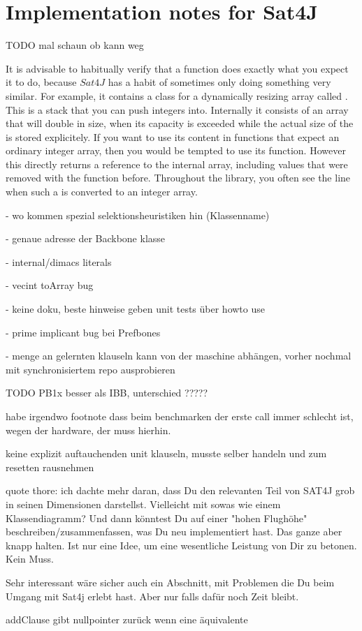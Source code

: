 \section{Implementation notes for Sat4J}




TODO mal schaun ob kann weg


It is advisable to habitually verify that a function does exactly what you expect it to do, because $Sat4J$ has a habit of sometimes only doing something very similar. For example, it contains a class for a dynamically resizing array called . This is a stack that you can push integers into. Internally it consists of an array that will double in size, when its capacity is exceeded while the actual size of the  is stored explicitely. If you want to use its content in functions that expect an ordinary integer array, then you would be tempted to use its  function. However this directly returns a reference to the internal array, including values that were removed with the  function before. Throughout the library, you often see the line  when such a  is converted to an integer array. 

- wo kommen spezial selektionsheuristiken hin (Klassenname)

- genaue adresse der Backbone klasse

- internal/dimacs literals

- vecint toArray bug

- keine doku, beste hinweise geben unit tests über howto use

- prime implicant bug bei Prefbones

- menge an gelernten klauseln kann von der maschine abhängen, vorher nochmal mit synchronisiertem repo ausprobieren

TODO PB1x besser als IBB, unterschied ?????

habe irgendwo footnote dass beim benchmarken der erste call immer schlecht ist, wegen der hardware, der muss hierhin.

keine explizit auftauchenden unit klauseln, musste selber handeln und zum resetten rausnehmen

quote thore: ich dachte mehr daran, dass Du den relevanten Teil von SAT4J grob in seinen Dimensionen darstellst. Vielleicht mit sowas wie einem Klassendiagramm? Und dann könntest Du auf einer "hohen Flughöhe" beschreiben/zusammenfassen, was Du neu implementiert hast. Das ganze aber knapp halten. Ist nur eine Idee, um eine wesentliche Leistung von Dir zu betonen. Kein Muss.

Sehr interessant wäre sicher auch ein Abschnitt, mit Problemen die Du beim Umgang mit Sat4j erlebt hast. Aber nur falls dafür noch Zeit bleibt. 


addClause gibt nullpointer zurück wenn eine äquivalente 